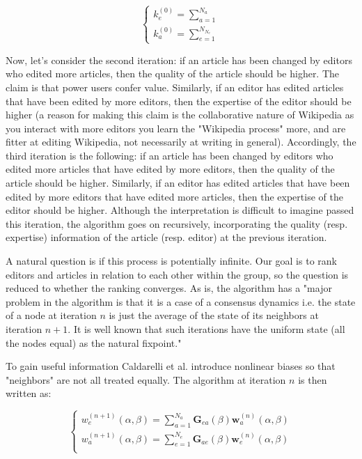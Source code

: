 \begin{equation}
\begin{cases}
 k_{e}^{(0)} = \sum_{a=1}^{N_{a}}\\
 k_{a}^{(0)} = \sum_{e=1}^{N_{N_{e}}}
\end{cases}
\label{HHinit}
\end{equation}

Now, let's consider the second iteration:  if an article has been changed by editors who edited more articles, then the quality of the article should be higher. The claim is that power users confer value. Similarly, if an editor has edited articles that have been edited by more editors, then the expertise of the editor should be higher (a reason for making this claim is the collaborative nature of Wikipedia as you interact with more editors you learn the "Wikipedia process" more, and are fitter at editing Wikipedia, not necessarily at writing in general). 
Accordingly, the third iteration is the following: if an article has been changed by editors who edited more articles that have edited by more editors, then the quality of the article should be higher. Similarly, if an editor has edited articles that have been edited by more editors that have edited more articles, then the expertise of the editor should be higher. Although the interpretation is difficult to imagine passed this iteration, the algorithm goes on recursively, incorporating the quality (resp. expertise) information of the article (resp. editor) at the previous iteration.

A natural question is if this process is potentially infinite. Our goal is to rank editors and articles in relation to each other within the group, so the question is reduced to whether the ranking converges. As is, the algorithm
has a "major problem in the algorithm is that it is a case of a
consensus dynamics i.e. the state of a node at iteration $n$ is just
the average of the state of its neighbors at iteration $n+1$. It is well
known that such iterations have the uniform state (all the nodes
equal) as the natural fixpoint." \cite{caldarelli2012network}

To gain useful information Caldarelli et al. introduce nonlinear biases so that "neighbors" are not all treated equally. The algorithm at iteration $n$ is then written as:

\begin{equation}
\begin{cases}
 w^{(n+1)}_e (\alpha,\beta) = \sum_{a=1}^{N_a}  \mathbf{G}_{ea}(\beta) \mathbf{w}^{(n)}_a (\alpha,\beta)\\
w^{(n+1)}_a (\alpha,\beta) = \sum_{e=1}^{N_e}  \mathbf{G}_{ae}(\beta) \mathbf{w}^{(n)}_e (\alpha,\beta)\\
\end{cases}
\label{random_walker}
\end{equation}

